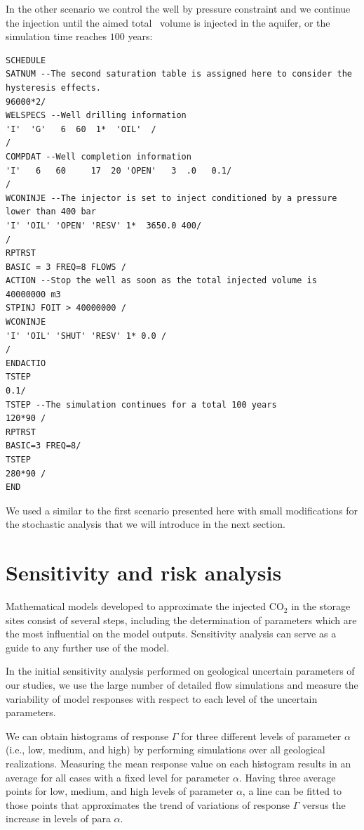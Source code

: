 In the other scenario we control the well by pressure constraint and we continue the injection until the aimed total \coo\ volume is injected in the aquifer, or the simulation time reaches $100$ years:
\begin{lstlisting}
SCHEDULE
SATNUM --The second saturation table is assigned here to consider the hysteresis effects.
96000*2/  
WELSPECS --Well drilling information
'I'  'G'   6  60  1*  'OIL'  /
/
COMPDAT --Well completion information
'I'   6   60     17  20 'OPEN'   3  .0   0.1/
/
WCONINJE --The injector is set to inject conditioned by a pressure lower than 400 bar
'I' 'OIL' 'OPEN' 'RESV' 1*  3650.0 400/
/
RPTRST
BASIC = 3 FREQ=8 FLOWS /
ACTION --Stop the well as soon as the total injected volume is 40000000 m3
STPINJ FOIT > 40000000 /
WCONINJE
'I' 'OIL' 'SHUT' 'RESV' 1* 0.0 /
/
ENDACTIO
TSTEP
0.1/
TSTEP --The simulation continues for a total 100 years
120*90 /
RPTRST
BASIC=3 FREQ=8/
TSTEP
280*90 /
END
\end{lstlisting}
We used a similar to the first scenario presented here with small modifications for the stochastic analysis that we will introduce in the next section.

\section{Sensitivity and risk analysis}
\label{sec:StochasticAnalysis}

Mathematical models developed to approximate the injected $\mbox{CO}_{2}$ in the
storage sites consist of several steps, including the determination of
parameters which are the most influential on the model outputs. Sensitivity
analysis can serve as a guide to any further use of the model.

In the initial sensitivity analysis performed on geological uncertain
parameters of our studies, we use the large number of detailed flow
simulations and measure the variability of model responses with respect to each
level of the uncertain parameters.

We can obtain histograms of response $\Gamma$  for three different levels of
parameter $\alpha$ (i.e., low, medium, and high) by performing simulations over
all geological realizations. Measuring the mean response value on
each histogram results in an average for all cases with a fixed level for
parameter $\alpha$. Having three average points for low, medium,
and high levels of parameter $\alpha$, a line can be fitted to those points 
that approximates the trend of variations of response $\Gamma$ versus the
increase in levels of para $\alpha$.

